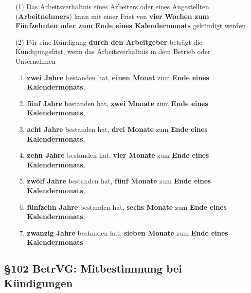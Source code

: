 \documentclass[a4paper, 12pt]{report}
\begin{document}
\begin{itemize}
    \item[(1)] Das Arbeitsverhältnis eines Arbeiters oder eines Angestellten 
        (\textbf{Arbeitnehmers}) kann mit einer Frist von \textbf{vier Wochen 
        zum Fünfzehnten oder zum Ende eines Kalendermonats} gekündigt werden. 
    \item[(2)] Für eine Kündigung \textbf{durch den Arbeitgeber} beträgt die 
        Kündigungsfrist, wenn das Arbeitsverhältnis in dem Betrieb oder 
        Unternehmen
        \begin{enumerate}
            \item \textbf{zwei Jahre} bestanden hat, \textbf{einen Monat} zum
                \textbf{Ende eines Kalendermonats},
            \item \textbf{fünf Jahre} bestanden hat, \textbf{zwei Monate} zum 
                \textbf{Ende eines Kalendermonats},
            \item \textbf{acht Jahre} bestanden hat, \textbf{drei Monate} zum
                \textbf{Ende eines Kalendermonats},
            \item \textbf{zehn Jahre} bestanden hat, \textbf{vier Monate} zum 
                \textbf{Ende eines Kalendermonats},
            \item \textbf{zwölf Jahre} bestanden hat, \textbf{fünf Monate} zum
                \textbf{Ende eines Kalendermonats},
            \item \textbf{fünfzehn Jahre} bestanden hat, \textbf{sechs Monate} 
                zum \textbf{Ende eines Kalendermonats},
            \item \textbf{zwanzig Jahre} bestanden hat, \textbf{sieben Monate} 
                zum \textbf{Ende eines Kalendermonats}
        \end{enumerate}
\end{itemize}

\newpage
\subsection{\S 102 BetrVG: Mitbestimmung bei Kündigungen}
\end{document}
